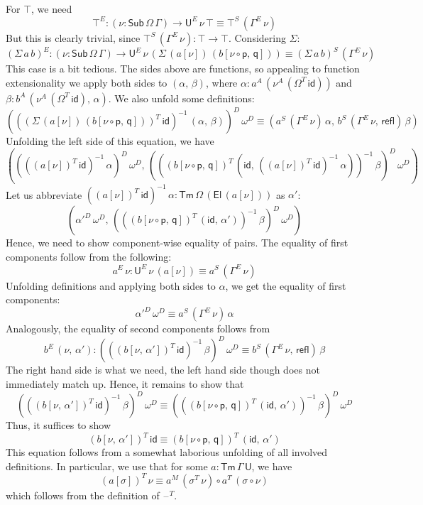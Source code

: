 \documentclass[12pt,a4paper,twoside,openany]{book}
\theoremstyle{remark}
\theoremstyle{definition}
\theoremstyle{theorem}
\newcommand{\refl}{\mathsf{refl}}
\newcommand{\id}{\mathsf{id}}
\newcommand{\Sub}{\mathsf{Sub}}
\newcommand{\Tm}{\mathsf{Tm}}
\newcommand{\U}{\mathsf{U}}
\newcommand{\El}{\mathsf{El}}
\newcommand{\blank}{\mathord{\hspace{1pt}\text{--}\hspace{1pt}}}
\newcommand{\p}{\mathsf{p}}
\newcommand{\q}{\mathsf{q}}
\begin{document}
For $\top$, we need
\[
  \top^E : (\nu : \Sub\,\Omega\,\Gamma) \to \U^E\,\nu\,\top \equiv \top^S\,(\Gamma^E\,\nu)
\]
But this is clearly trivial, since $\top^S\,(\Gamma^E\,\nu) : \top \to \top$. Considering $\Sigma$:
\[
(\Sigma\,a\,b)^E : (\nu : \Sub\,\Omega\,\Gamma) \to
  \U^E\,\nu\,(\Sigma\,(a[\nu])\,(b[\nu\circ\p,\,\q])) \equiv (\Sigma\,a\,b)^S\,(\Gamma^E\,\nu)
\]
This case is a bit tedious. The sides above are functions, so appealing to function extensionality
we apply both sides to $(\alpha,\,\beta)$, where $\alpha : a^A\,(\nu^A\,(\Omega^T\,\id))$ and
$\beta : b^A\,(\nu^A\,(\Omega^T\,\id),\,\alpha)$. We also unfold some definitions:
\[
(((\Sigma\,(a[\nu])\,(b[\nu\circ\p,\,\q]))^T\,\id)^{-1}\,(\alpha,\,\beta))^D\,\omega^D \equiv
(a^S\,(\Gamma^E\,\nu)\,\alpha,\,b^S\,(\Gamma^E\,\nu,\,\refl)\,\beta)
\]
Unfolding the left side of this equation, we have
\[
  ((((a[\nu])^T\,\id)^{-1}\,\alpha)^D\,\omega^D,\,(((b[\nu\circ\p,\,\q])^T\,(\id,\,((a[\nu])^T\,\id)^{-1}\,\alpha))^{-1}\,\beta)^D\,\omega^D)
\]
Let us abbreviate $((a[\nu])^T\,\id)^{-1}\,\alpha : \Tm\,\Omega\,(\El\,(a[\nu]))$ as $\alpha'$:
\[
  (\alpha'^D\,\omega^D,\,(((b[\nu\circ\p,\,\q])^T\,(\id,\,\alpha'))^{-1}\,\beta)^D\,\omega^D)
\]
Hence, we need to show component-wise equality of pairs. The equality of first components follow
from the following:
\[
  a^E\,\nu : \U^E\,\nu\,(a[\nu]) \equiv a^S\,(\Gamma^E\,\nu)
\]
Unfolding definitions and applying both sides to $\alpha$, we get the equality of first components:
\[
  \alpha'^D\,\omega^D \equiv a^S\,(\Gamma^E\,\nu)\,\alpha
\]
Analogously, the equality of second components follows from
\[
b^E\,(\nu,\,\alpha') :
 (((b[\nu,\,\alpha'])^T\,\id)^{-1}\,\beta)^D\,\omega^D \equiv b^S\,(\Gamma^E\,\nu,\,\refl)\,\beta
\]
The right hand side is what we need, the left hand side though does not immediately match up.
Hence, it remains to show that
\[
(((b[\nu,\,\alpha'])^T\,\id)^{-1}\,\beta)^D\,\omega^D
\equiv
(((b[\nu\circ\p,\,\q])^T\,(\id,\,\alpha'))^{-1}\,\beta)^D\,\omega^D
\]
Thus, it suffices to show
\[
(b[\nu,\,\alpha'])^T\,\id \equiv (b[\nu\circ\p,\,\q])^T\,(\id,\,\alpha')
\]
This equation follows from a somewhat laborious unfolding of all involved definitions.
In particular, we use that for some $a : \Tm\,\Gamma\,\U$, we have
\[
  (a[\sigma])^T\,\nu \equiv a^M\,(\sigma^T\,\nu) \circ a^T\,(\sigma \circ \nu)
\]
which follows from the definition of $\blank^T$.
\end{document}
